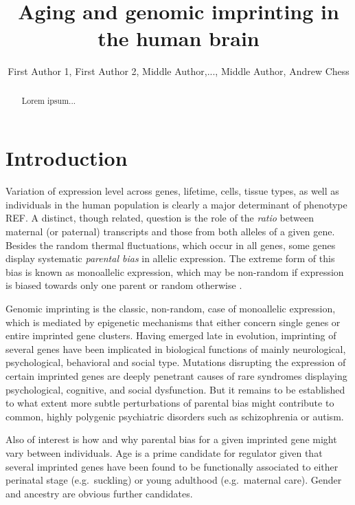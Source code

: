 \documentclass[letterpaper]{article}
\title{Aging and genomic imprinting in the human brain}
\author{First Author 1, First Author 2, Middle Author,..., Middle Author, Andrew
Chess}
\begin{document}
\maketitle

\begin{abstract}
Lorem ipsum...
\end{abstract}

\section{Introduction}

Variation of expression level across genes, lifetime, cells, tissue types, as
well as individuals in the human population is clearly a major determinant of
phenotype REF.  A distinct, though related, question is the role of the
\emph{ratio} between maternal (or paternal) transcripts and those from both
alleles of a given gene.  Besides the random thermal fluctuations, which occur
in all genes, some genes display systematic \emph{parental bias} in allelic
expression.  The extreme form of this bias is known as monoallelic expression,
which may be non-random if expression is biased towards only one parent or
random otherwise \cite{Chess2012}.

Genomic imprinting is the classic, non-random, case of monoallelic expression,
which is mediated by epigenetic mechanisms that either concern single genes or
entire imprinted gene clusters.  Having emerged late in evolution, imprinting
of several genes have been implicated in biological functions of mainly
neurological, psychological, behavioral and social type.  Mutations disrupting
the expression of certain imprinted genes are deeply penetrant causes of rare
syndromes displaying psychological, cognitive, and social dysfunction.  But it
remains to be established to what extent more subtle perturbations of parental
bias might contribute to common, highly polygenic psychiatric disorders such
as schizophrenia or autism.

Also of interest is how and why parental bias for a given imprinted gene
might vary between individuals.  Age is a prime candidate for regulator
given that several imprinted genes have been found to be functionally associated to either
perinatal stage (e.g.~suckling) or young adulthood (e.g.~maternal care).
Gender and ancestry are obvious further candidates.
\end{document}
